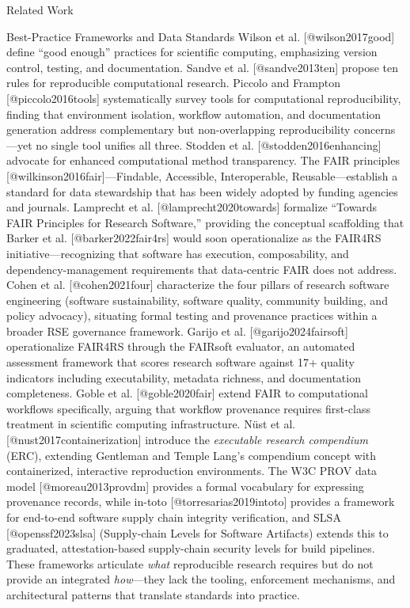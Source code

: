 \documentclass[
  ignorenonframetext,
]{beamer}
\begin{document}
\begin{frame}[fragile]{Related Work}
\begin{block}{Best-Practice Frameworks and Data Standards}
\protect{}\label{best-practice-frameworks-and-data-standards}
Wilson et al. {[}@wilson2017good{]} define ``good enough'' practices for
scientific computing, emphasizing version control, testing, and
documentation. Sandve et al. {[}@sandve2013ten{]} propose ten rules for
reproducible computational research. Piccolo and Frampton
{[}@piccolo2016tools{]} systematically survey tools for computational
reproducibility, finding that environment isolation, workflow
automation, and documentation generation address complementary but
non-overlapping reproducibility concerns---yet no single tool unifies
all three. Stodden et al. {[}@stodden2016enhancing{]} advocate for
enhanced computational method transparency. The FAIR principles
{[}@wilkinson2016fair{]}---Findable, Accessible, Interoperable,
Reusable---establish a standard for data stewardship that has been
widely adopted by funding agencies and journals. Lamprecht et al.
{[}@lamprecht2020towards{]} formalize ``Towards FAIR Principles for
Research Software,'' providing the conceptual scaffolding that Barker et
al. {[}@barker2022fair4rs{]} would soon operationalize as the FAIR4RS
initiative---recognizing that software has execution, composability, and
dependency-management requirements that data-centric FAIR does not
address. Cohen et al. {[}@cohen2021four{]} characterize the four pillars
of research software engineering (software sustainability, software
quality, community building, and policy advocacy), situating formal
testing and provenance practices within a broader RSE governance
framework. Garijo et al. {[}@garijo2024fairsoft{]} operationalize
FAIR4RS through the FAIRsoft evaluator, an automated assessment
framework that scores research software against 17+ quality indicators
including executability, metadata richness, and documentation
completeness. Goble et al. {[}@goble2020fair{]} extend FAIR to
computational workflows specifically, arguing that workflow provenance
requires first-class treatment in scientific computing infrastructure.
Nüst et al. {[}@nust2017containerization{]} introduce the
\emph{executable research compendium} (ERC), extending Gentleman and
Temple Lang's compendium concept with containerized, interactive
reproduction environments. The W3C PROV data model
{[}@moreau2013provdm{]} provides a formal vocabulary for expressing
provenance records, while in-toto {[}@torresarias2019intoto{]} provides
a framework for end-to-end software supply chain integrity verification,
and SLSA {[}@openssf2023slsa{]} (Supply-chain Levels for Software
Artifacts) extends this to graduated, attestation-based supply-chain
security levels for build pipelines. These frameworks articulate
\emph{what} reproducible research requires but do not provide an
integrated \emph{how}---they lack the tooling, enforcement mechanisms,
and architectural patterns that translate standards into practice.
\end{block}


\end{frame}
\end{document}
